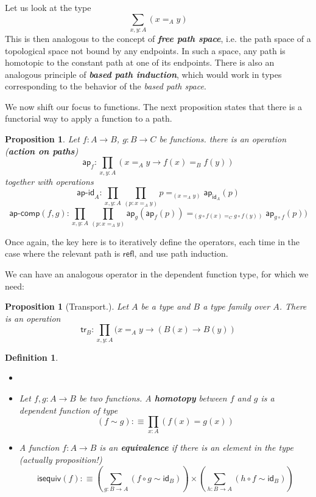 \documentclass{scrartcl}
\newcommand{\textbi}[1]{\textbf{\textit{#1}}}
\newtheorem{defin}[subsection]{Definition}
\newtheorem{prop}[subsection]{Proposition}
\begin{document}
Let us look at the type $$\sum_{x,y:A}(x=_Ay)$$
This is then analogous to the concept of \textbi{free path space}, i.e. the path space of a topological space not bound by any endpoints. In such a space, any path is homotopic to the constant path at one of its endpoints. There is also an analogous principle of \textbi{based path induction}, which would work in types corresponding to the behavior of the \textit{based path space}.  

\par We now shift our focus to functions. The next proposition states that there is a functorial way to apply a function to a path.
\begin{prop}
    Let $f:A\to B$, $g:B\to C$ be functions. there is an operation (\textbi{action on paths})
    $$\mathsf{ap}_f: \prod_{x,y:A}(x=_Ay\to f(x)=_Bf(y))$$
    together with operations
    $$\mathsf{ap\text{-}id}_A:\prod_{x,y:A}\prod_{(p:x=_Ay)}p=_{(x=_Ay)}\mathsf{ap}_{\mathsf{id}_A}(p)$$
    $$\mathsf{ap\text{-}comp}(f,g):\prod_{x,y:A}\prod_{(p:x=_Ay)}\mathsf{ap}_{g}(\mathsf{ap}_{f}(p))=_{(g\circ f(x)=_Cg\circ f(y))}\mathsf{ap}_{g\circ f}(p))$$
\end{prop}

Once again, the key here is to iteratively define the operators, each time in the case where the relevant path is $\mathsf{refl}$, and use path induction.

\par We can have an analogous operator in the dependent function type, for which we need:
\begin{prop}[Transport.]
    Let $A$ be a type and $B$ a type family over $A$. There is an operation 
    $$\mathsf{tr}_B:\prod_{x,y:A}(x=_Ay\to (B(x)\to B(y))$$
\end{prop}

\begin{defin}
    \begin{itemize}
        \item[] 
        \item Let $f,g:A\to B$ be two functions. A \textbi{homotopy} between $f$ and $g$ is a dependent function of type $$(f\sim g):\equiv\prod_{x:A}(f(x)=g(x))$$
        \item A function $f:A\to B$ is an \textbi{equivalence} if there is an element in the type (actually proposition!)
        $$\mathsf{isequiv}(f):\equiv (\sum_{g:B\to A}(f\circ g\sim \mathsf{id}_B))\times(\sum_{h:B\to A}(h\circ f\sim \mathsf{id}_B))$$
    \end{itemize}
\end{defin}
\end{document}
